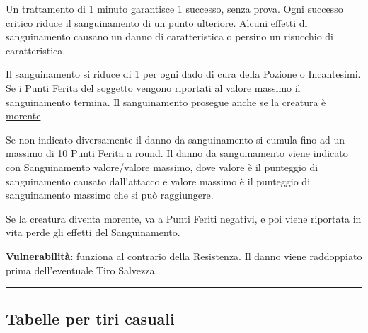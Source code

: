 \begin{multicols}{2}
Un trattamento di 1 minuto garantisce 1 successo, senza prova. Ogni successo critico riduce il sanguinamento di un punto ulteriore. Alcuni effetti di sanguinamento causano un danno di caratteristica o persino un risucchio di caratteristica.

Il sanguinamento si riduce di 1 per ogni dado di cura della Pozione o Incantesimi. Se i Punti Ferita del soggetto vengono riportati al valore massimo il sanguinamento termina. Il sanguinamento prosegue anche se la creatura è \hyperlink{morente}{morente}.

Se non indicato diversamente il danno da sanguinamento si cumula fino ad un massimo di 10 Punti Ferita a round. Il danno da sanguinamento viene indicato con Sanguinamento valore/valore massimo, dove valore è il punteggio di sanguinamento causato dall'attacco e valore massimo è il punteggio di sanguinamento massimo che si può raggiungere.

Se la creatura diventa morente, va a Punti Feriti negativi, e poi viene riportata in vita perde gli effetti del Sanguinamento.

\textbf{Vulnerabilità}: funziona al contrario della Resistenza. Il danno viene raddoppiato prima dell'eventuale Tiro Salvezza.

\end{multicols}

\pagebreak

\noindent\rule{\textwidth}{0.4pt}

\subsection{Tabelle per tiri casuali}


